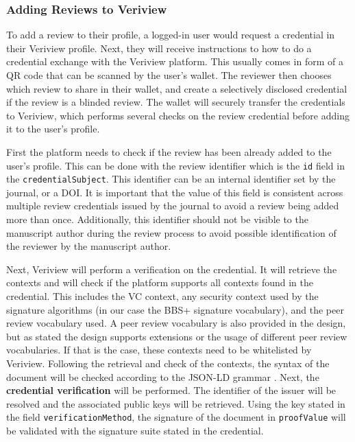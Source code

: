 

\subsubsection{Adding Reviews to Veriview}

To add a review to their profile, a logged-in user would request a credential in their Veriview profile. Next, they will receive instructions to how to do a credential exchange with the Veriview platform. This usually comes in form of a QR code that can be scanned by the user's wallet. The reviewer then chooses which review to share in their wallet, and create a selectively disclosed credential if the review is a blinded review. The wallet will securely transfer the credentials to Veriview, which performs several checks on the review credential before adding it to the user's profile.

First the platform needs to check if the review has been already added to the user's profile. This can be done with the review identifier which is the \lstinline{id} field in the \lstinline{credentialSubject}. This identifier can be an internal identifier set by the journal, or a \acrshort{DOI}. It is important that the value of this field is consistent across multiple review credentials issued by the journal to avoid a review being added more than once. Additionally, this identifier should not be visible to the manuscript author during the review process to avoid possible identification of the reviewer by the manuscript author.

Next, Veriview will perform a verification on the credential. It will retrieve the contexts and will check if the platform supports all contexts found in the credential. This includes the \acrshort{VC} context, any security context used by the signature algorithms (in our case the BBS+ signature vocabulary), and the peer review vocabulary used. A peer review vocabulary is also provided in the design, but as stated the design supports extensions or the usage of different peer review vocabularies. If that is the case, these contexts need to be whitelisted by Veriview. Following the retrieval and check of the contexts, the syntax of the document will be checked according to the \acrshort{JSON-LD} grammar \parencite{jsonld}. Next, the \textbf{credential verification} will be performed. The identifier of the issuer will be resolved and the associated public keys will be retrieved. Using the key stated in the field \lstinline{verificationMethod}, the signature of the document in \lstinline{proofValue} will be validated with the signature suite stated in the credential. 

